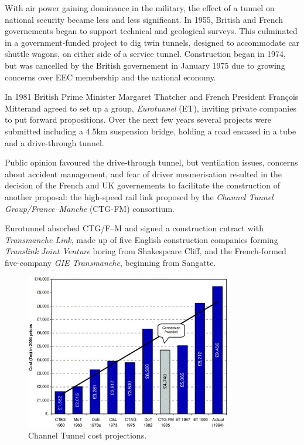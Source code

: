 \documentclass[12pt]{article} %
\begin{document}
With air power gaining dominance in the military, the effect of a tunnel on national security became less and less significant. In 1955, British and French governements began to support technical and geological surveys. This culminated in a government-funded project to dig twin tunnels, designed to accommodate car shuttle wagons, on either side of a service tunnel. Construction began in 1974, but was cancelled by the British governement in January 1975 due to growing concerns over EEC membership and the national economy.

In 1981 British Prime Minister Margaret Thatcher and French President François Mitterand agreed to set up a group, \emph{Eurotunnel} (ET), inviting private companies to put forward propositions. Over the next few years several projects were submitted including a 4.5km suspension bridge, holding a road encased in a tube and a drive-through tunnel.

Public opinion favoured the drive-through tunnel, but ventilation issues, concerns about accident management, and fear of driver mesmerisation resulted in the decision of the French and UK governements to facilitate the construction of another proposal: the high-speed rail link proposed by the \emph{Channel Tunnel Group\slash France--Manche} (CTG-FM) consortium.

Eurotunnel absorbed CTG/F--M and signed a construction cntract with \emph{Transmanche Link}, made up of five English construction companies forming \emph{Translink Joint Venture} boring from Shakespeare Cliff, and the French-formed five-company \emph{GIE Transmanche}, beginning from Sangatte.

\begin{figure}[tp]
  \centering
  \includegraphics[width=0.8\textwidth]{costproj}
  \caption{Channel Tunnel cost projections.}
  \label{fig:costproj}
\end{figure}
\end{document}
